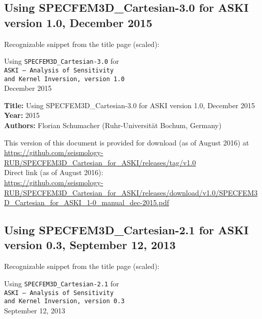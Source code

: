 \subsection*{Using SPECFEM3D\_Cartesian-3.0 for ASKI version 1.0, December 2015}

Recognizable snippet from the title page (scaled):

\begin{center}
  {\large Using} {\tt \LARGE SPECFEM3D\_Cartesian-3.0} {\large for} \\ {\tt {\LARGE ASKI} {\rm--} {\LARGE A}{\small nalysis of} {\LARGE S}{\small ensitivity \\ and} {\LARGE\tt K}{\small ernel} {\LARGE\tt I}{\small nversion, version 1.0}}\\December 2015
\end{center}

{\bf Title: } Using SPECFEM3D\_Cartesian-3.0 for ASKI version 1.0, December 2015\\
{\bf Year: } 2015\\
{\bf Authors: } Florian Schumacher (Ruhr-Universit\"at Bochum, Germany)

This version of this document is provided for download (as of August 2016) at\\
\url{https://github.com/seismology-RUB/SPECFEM3D_Cartesian_for_ASKI/releases/tag/v1.0}\\
Direct link (as of August 2016):\\
\url{https://github.com/seismology-RUB/SPECFEM3D_Cartesian_for_ASKI/releases/download/v1.0/SPECFEM3D_Cartesian_for_ASKI_1-0_manual_dec-2015.pdf}


\subsection*{Using SPECFEM3D\_Cartesian-2.1 for ASKI version 0.3, September 12, 2013}

Recognizable snippet from the title page (scaled):

\begin{center}
  {\large Using} {\tt \LARGE SPECFEM3D\_Cartesian-2.1} {\large for} \\ {\tt {\LARGE ASKI} {\rm--} {\LARGE A}{\small nalysis of} {\LARGE S}{\small ensitivity \\ and} {\LARGE\tt K}{\small ernel} {\LARGE\tt I}{\small nversion, version 0.3}}\\September 12, 2013
\end{center}

